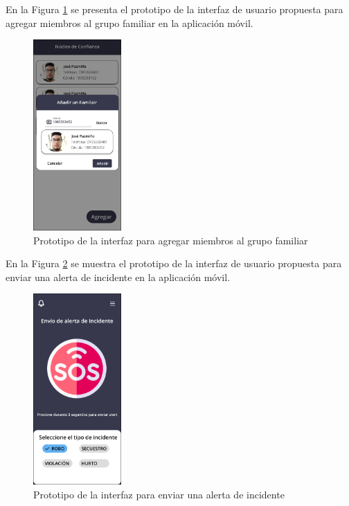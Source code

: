 En la Figura \ref{fig:prototipo-agregar-miembro-mobile} se presenta el prototipo de la interfaz de usuario propuesta para
agregar miembros al grupo familiar en la aplicación móvil.

\begin{figure}[H]
      \centering
      \includegraphics[width=0.3\textwidth]{chapters/III-resultados-y-discusion/resources/images/prototipo-agregar-miembro-mobile.png}
      \caption{Prototipo de la interfaz para agregar miembros al grupo familiar}
      \label{fig:prototipo-agregar-miembro-mobile}
\end{figure}

En la Figura \ref{fig:prototipo-inicio-mobile} se muestra el prototipo de la interfaz de usuario propuesta para
enviar una alerta de incidente en la aplicación móvil.

\begin{figure}[H]
      \centering
      \includegraphics[width=0.3\textwidth]{chapters/III-resultados-y-discusion/resources/images/prototipo-inicio-mobile.png}
      \caption{Prototipo de la interfaz para enviar una alerta de incidente}
      \label{fig:prototipo-inicio-mobile}
\end{figure}


